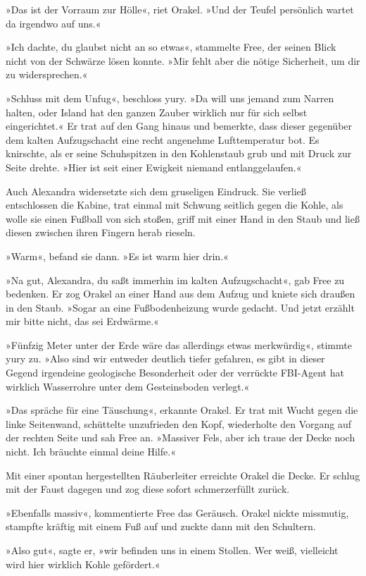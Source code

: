 »Das ist der Vorraum zur Hölle«, riet Orakel. »Und der Teufel persönlich wartet da irgendwo auf uns.«

»Ich dachte, du glaubst nicht an so etwas«, stammelte Free, der seinen Blick nicht von der Schwärze lösen konnte. »Mir fehlt aber die nötige Sicherheit, um dir zu widersprechen.«

»Schluss mit dem Unfug«, beschloss yury. »Da will uns jemand zum Narren halten, oder Island hat den ganzen Zauber wirklich nur für sich selbst eingerichtet.« Er trat auf den Gang hinaus und bemerkte, dass dieser gegenüber dem kalten Aufzugschacht eine recht angenehme Lufttemperatur bot. Es knirschte, als er seine Schuhspitzen in den Kohlenstaub grub und mit Druck zur Seite drehte. »Hier ist seit einer Ewigkeit niemand entlanggelaufen.«

Auch Alexandra widersetzte sich dem gruseligen Eindruck. Sie verließ entschlossen die Kabine, trat einmal mit Schwung seitlich gegen die Kohle, als wolle sie einen Fußball von sich stoßen, griff mit einer Hand in den Staub und ließ diesen zwischen ihren Fingern herab rieseln.

»Warm«, befand sie dann. »Es ist warm hier drin.«

»Na gut, Alexandra, du saßt immerhin im kalten Aufzugschacht«, gab Free zu bedenken. Er zog Orakel an einer Hand aus dem Aufzug und kniete sich draußen in den Staub. »Sogar an eine Fußbodenheizung wurde gedacht. Und jetzt erzählt mir bitte nicht, das sei Erdwärme.«

»Fünfzig Meter unter der Erde wäre das allerdings etwas merkwürdig«, stimmte yury zu. »Also sind wir entweder deutlich tiefer gefahren, es gibt in dieser Gegend irgendeine geologische Besonderheit oder der verrückte FBI-Agent hat wirklich Wasserrohre unter dem Gesteinsboden verlegt.«

»Das spräche für eine Täuschung«, erkannte Orakel. Er trat mit Wucht gegen die linke Seitenwand, schüttelte unzufrieden den Kopf, wiederholte den Vorgang auf der rechten Seite und sah Free an. »Massiver Fels, aber ich traue der Decke noch nicht. Ich bräuchte einmal deine Hilfe.«

Mit einer spontan hergestellten Räuberleiter erreichte Orakel die Decke. Er schlug mit der Faust dagegen und zog diese sofort schmerzerfüllt zurück.

»Ebenfalls massiv«, kommentierte Free das Geräusch. Orakel nickte missmutig, stampfte kräftig mit einem Fuß auf und zuckte dann mit den Schultern.

»Also gut«, sagte er, »wir befinden uns in einem Stollen. Wer weiß, vielleicht wird hier wirklich Kohle gefördert.«

